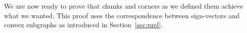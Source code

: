 \documentclass[final,11pt]{article}
\newtheorem{lem}[thm]{Lemma}%
\newcommand{\comment}[1]{\textcolor{red}{#1}}
\newcommand{\TODO}[1]{\emph{\textcolor{red}{#1}}}
\begin{document}
% 
% 
% 
% 

We are now ready to prove that chunks and corners as we defined them achieve what we wanted.  This proof uses the correspondence between sign-vectors and convex subgraphs as introduced in Section~\ref{sec:prel}.
\end{document}
